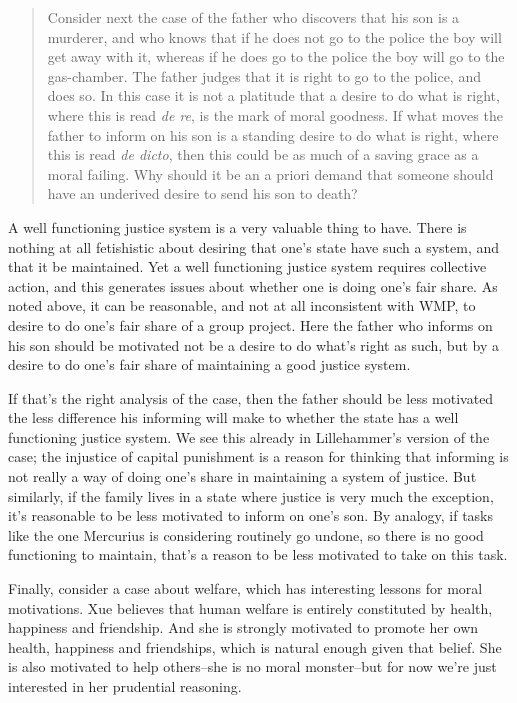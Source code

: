 \begin{quote}
Consider next the case of the father who discovers that his son is a murderer, and who knows that if he does not go to the police the boy will get away with it, whereas if he does go to the police the boy will go to the gas-chamber. The father judges that it is right to go to the police, and does so. In this case it is not a platitude that a desire to do what is right, where this is read \emph{de re}, is the mark of moral goodness. If what moves the father to inform on his son is a standing desire to do what is right, where this is read \emph{de dicto}, then this could be as much of a saving grace as a moral failing. Why should it be an a priori demand that someone should have an underived desire to send his son to death? ~\citep[192]{Lillehammer1997}
\end{quote}
A well functioning justice system is a very valuable thing to have. There is nothing at all fetishistic about desiring that one's state have such a system, and that it be maintained. Yet a well functioning justice system requires collective action, and this generates issues about whether one is doing one's fair share. As noted above, it can be reasonable, and not at all inconsistent with WMP, to desire to do one's fair share of a group project. Here the father who informs on his son should be motivated not be a desire to do what's right as such, but by a desire to do one's fair share of maintaining a good justice system.

If that's the right analysis of the case, then the father should be less motivated the less difference his informing will make to whether the state has a well functioning justice system. We see this already in Lillehammer's version of the case; the injustice of capital punishment is a reason for thinking that informing is not really a way of doing one's share in maintaining a system of justice. But similarly, if the family lives in a state where justice is very much the exception, it's reasonable to be less motivated to inform on one's son. By analogy, if tasks like the one \gls{Mercurius} is considering routinely go undone, so there is no good functioning to maintain, that's a reason to be less motivated to take on this task.

Finally, consider a case about welfare, which has interesting lessons for moral motivations. \gls{Xue} believes that human welfare is entirely constituted by health, happiness and friendship. And she is strongly motivated to promote her own health, happiness and friendships, which is natural enough given that belief. She is also motivated to help others--she is no moral monster--but for now we're just interested in her prudential reasoning.

